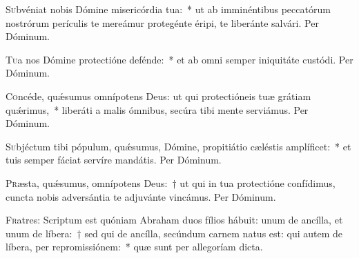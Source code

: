 \documentclass[vesperale_romanum.tex]{subfiles}
\begin{document}

\oratio

\lettrine{S}{u}bvéniat nobis Dómine misericórdia tua:~* ut ab imminéntibus peccatórum nostrórum perículis te mereámur protegénte éripi, te liberánte salvári.
Per Dóminum.



\oratio

\lettrine{T}{u}a nos Dómine prote\-ctióne defénde:~* et ab omni semper iniquitáte custódi. Per Dóminum.



\oratio

\lettrine{C}{o}ncéde, quǽsumus omnípotens Deus: ut qui prote\-ctióneis tuæ grátiam quǽrimus,~* liberáti a malis ómnibus, secúra tibi mente serviámus. Per Dóminum.



\oratio

\lettrine{S}{u}bjéctum tibi pópulum, quǽsumus, Dómine, propitiátio cæléstis amplíficet:~* et tuis semper fáciat servíre mandátis. Per Dóminum.



\oratio

\lettrine{P}{r}æsta, quǽsumus, omnípotens Deus:~† ut qui in tua prote\-ctióne confídimus, cuncta nobis adversántia te adjuvánte vincámus. Per Dóminum.



\lettrine{F}{r}atres: Scriptum est quóniam Abraham duos fílios hábuit: unum de ancílla, et unum de líbera:~† sed qui de ancílla, secúndum carnem natus est: qui autem de líbera, per repromissiónem:~* quæ sunt per allegoríam dicta.



\end{document}

